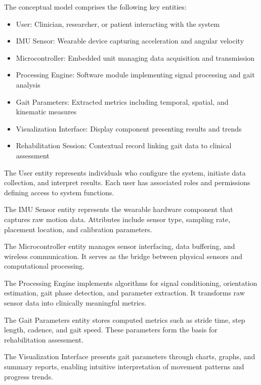 \documentclass[12pt,a4paper]{report}
\begin{document}
The conceptual model comprises the following key entities:
\begin{itemize}
\item User: Clinician, researcher, or patient interacting with the system

\item IMU Sensor: Wearable device capturing acceleration and angular velocity

\item Microcontroller: Embedded unit managing data acquisition and transmission

\item Processing Engine: Software module implementing signal processing and gait analysis

\item Gait Parameters: Extracted metrics including temporal, spatial, and kinematic measures

\item Visualization Interface: Display component presenting results and trends

\item Rehabilitation Session: Contextual record linking gait data to clinical assessment
\end{itemize}
The User entity represents individuals who configure the system, initiate data collection, and interpret results. Each user has associated roles and permissions defining access to system functions.

The IMU Sensor entity represents the wearable hardware component that captures raw motion data. Attributes include sensor type, sampling rate, placement location, and calibration parameters.

The Microcontroller entity manages sensor interfacing, data buffering, and wireless communication. It serves as the bridge between physical sensors and computational processing.

The Processing Engine implements algorithms for signal conditioning, orientation estimation, gait phase detection, and parameter extraction. It transforms raw sensor data into clinically meaningful metrics.

The Gait Parameters entity stores computed metrics such as stride time, step length, cadence, and gait speed. These parameters form the basis for rehabilitation assessment.

The Visualization Interface presents gait parameters through charts, graphs, and summary reports, enabling intuitive interpretation of movement patterns and progress trends.
\end{document}
